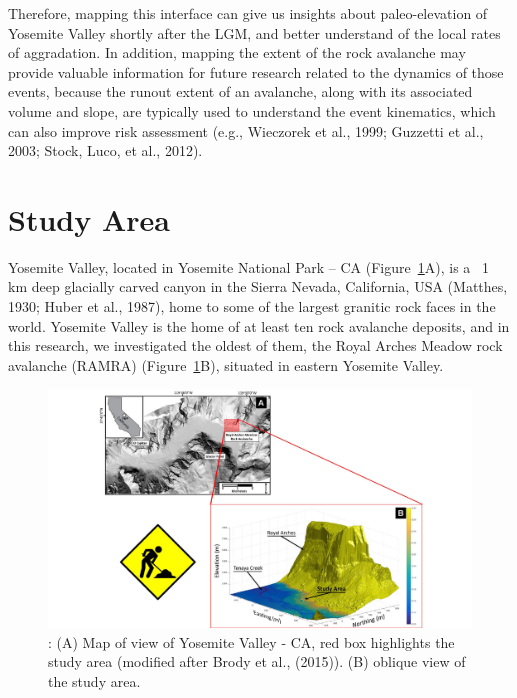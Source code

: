 \documentclass[5p]{elsarticle}
\begin{document}
Therefore, mapping this interface can give us insights about paleo-elevation of Yosemite Valley shortly after the LGM, and better understand of the local rates of aggradation. In addition, mapping the extent of the rock avalanche may provide valuable information for future research related to the dynamics of those events, because the runout extent of an avalanche, along with its associated volume and slope, are typically used to understand the event kinematics, which can also improve risk assessment (e.g., Wieczorek et al., 1999; Guzzetti et al., 2003; Stock, Luco, et al., 2012).





\section{Study Area}

Yosemite Valley, located in Yosemite National Park -- CA (Figure~\ref{Study_Area}A), is a ~1  km deep glacially carved canyon in the Sierra Nevada, California, USA (Matthes, 1930; Huber et al., 1987), home to some of the largest granitic rock faces in the world. Yosemite Valley is the home of at least ten rock avalanche deposits, and in this research,  we investigated the oldest of them, the Royal Arches Meadow rock avalanche (RAMRA) (Figure~\ref{Study_Area}B), situated in eastern Yosemite Valley. 

									\begin{figure}[h]

	\includegraphics[width=\textwidth]{Figures/Study_Area.pdf}
		\caption{: (A) Map of view of Yosemite Valley - CA, red box highlights the study area (modified after Brody et al., (2015)). (B) oblique view of the study area. \label{Study_Area}}


									\end{figure}
\end{document}
